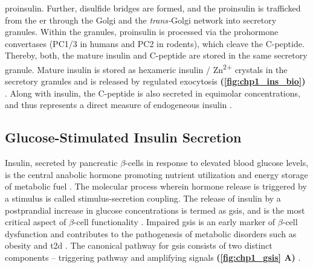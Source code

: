   proinsulin. Further, disulfide bridges are formed, and the proinsulin is trafficked from the \gls{er} through the Golgi and the \textit{trans-}Golgi network into secretory granules. Within the granules, proinsulin is processed via the prohormone convertases (PC1/3 in humans and PC2 in rodents), which cleave the C-peptide. Thereby, both, the mature insulin and C-peptide are stored in the same secretory granule. Mature insulin is stored as hexameric insulin / Zn\textsuperscript{2+} crystals in the secretory granules and is released by regulated exocytosis \textbf{(\autoref{fig:chp1_ins_bio})} \textbf{\cite{vasiljevic_making_2020,tokarz_cell_2018}}. Along with insulin, the C-peptide is also secreted in equimolar concentrations, and thus represents a direct measure of endogeneous insulin \textbf{\cite{venugopal_biochemistry_2024}}. 


\subsection{Glucose-Stimulated Insulin Secretion} %
\label{sec:gsis}


\par Insulin, secreted by pancreatic $\beta$-cells in response to elevated blood glucose levels, is the central anabolic hormone promoting nutrient utilization and energy storage of metabolic fuel \textbf{\cite{slack_developmental_1995}}. The molecular process wherein hormone release is triggered by a stimulus is called stimulus-secretion coupling. The release of insulin by a postprandial increase in glucose concentrations is termed as \acrfull{gsis}, and is the most critical aspect of $\beta$-cell functionality \textbf{\cite{ashcroft_stimulussecretion_1994}}.  Impaired \gls{gsis} is an early marker of $\beta$-cell dysfunction and contributes to the pathogenesis of metabolic disorders such as obesity and \gls{t2d} \textbf{\cite{jensen_metabolic_2008}}. The canonical pathway for \gls{gsis} consists of two distinct components – triggering pathway and amplifying signals \textbf{(\autoref{fig:chp1_gsis} A)} \textbf{\cite{henquin_triggering_2000}}.\\

